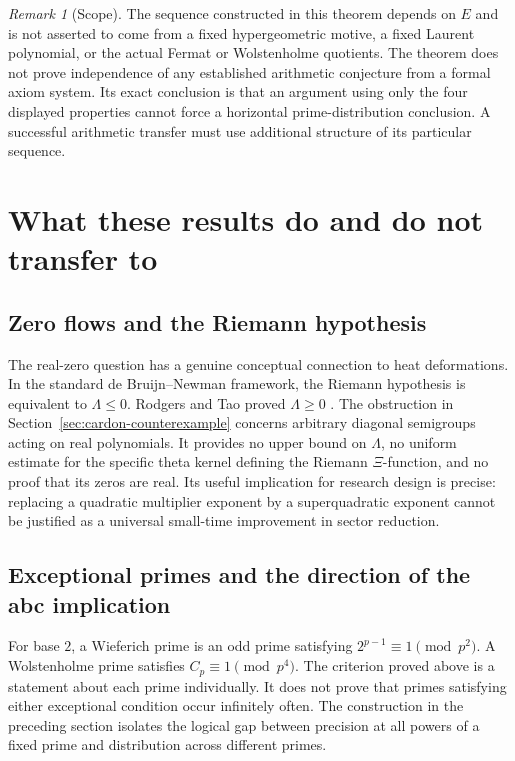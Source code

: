 \documentclass[11pt,a4paper]{article}
\theoremstyle{definition}
\theoremstyle{remark}
\newtheorem{remark}[theorem]{Remark}
\begin{document}
\begin{remark}[Scope]
The sequence constructed in this theorem depends on $E$ and is not
asserted to come from a fixed hypergeometric motive, a fixed Laurent
polynomial, or the actual Fermat or Wolstenholme quotients. The theorem
does not prove independence of any established arithmetic conjecture
from a formal axiom system. Its exact conclusion is that an argument
using only the four displayed properties cannot force a horizontal
prime-distribution conclusion. A successful arithmetic transfer must
use additional structure of its particular sequence.
\end{remark}

\section{What these results do and do not transfer to}
\label{sec:transfer-scope}

\subsection{Zero flows and the Riemann hypothesis}

The real-zero question has a genuine conceptual connection to heat
deformations.  In the standard de Bruijn--Newman framework, the
Riemann hypothesis is equivalent to $\Lambda\le0$.
Rodgers and Tao proved $\Lambda\ge0$ \cite{RodgersTao2020}.
The obstruction in Section~\ref{sec:cardon-counterexample} concerns
arbitrary diagonal semigroups acting on real polynomials.  It provides
no upper bound on $\Lambda$, no uniform estimate for the specific
theta kernel defining the Riemann $\Xi$-function, and no proof that
its zeros are real.  Its useful implication for research design is
precise: replacing a quadratic multiplier exponent by a
superquadratic exponent cannot be justified as a universal
small-time improvement in sector reduction.

\subsection{Exceptional primes and the direction of the abc implication}

For base $2$, a Wieferich prime is an odd prime satisfying
$2^{p-1}\equiv1\pmod{p^2}$.  A Wolstenholme prime satisfies
$C_p\equiv1\pmod{p^4}$.  The criterion proved above is a statement
about each prime individually.  It does not prove that primes
satisfying either exceptional condition occur infinitely often.
The construction in the preceding section isolates the logical gap
between precision at all powers of a fixed prime and distribution
across different primes.
\end{document}
